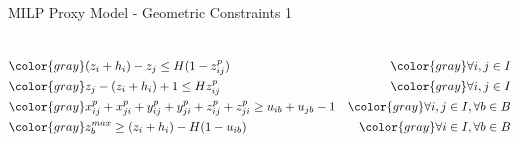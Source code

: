 \documentclass{beamer}
\begin{document}
\begin{frame}{MILP Proxy Model - Geometric Constraints 1}
\begin{columns}[onlytextwidth,T]
{\begin{minipage}{\linewidth}
\begin{align}
                                         & \color{gray} (z_i + h_i) - z_j\le H(1 - z^p_{ij})                                                     & \color{gray} \forall i,j \in I \notag \\
                                         & \color{gray} z_j - (z_i + h_i) + 1 \le H z^p_{ij}                                                     & \color{gray} \forall i,j \in I \notag \\
                                         & \color{gray} x^p_{ij} + x^p_{ji} + y^p_{ij} + y^p_{ji} + z^p_{ij} + z^p_{ji} \ge u_{ib} + u_{jb} - 1  & \color{gray} \forall i,j \in I, \forall b \in B \notag \\
                                         & \color{gray} z^{max}_b \ge (z_i + h_i) - H(1-u_{ib})                                                  & \color{gray} \forall i \in I, \forall b \in B \notag
                    \end{align}
                \end{minipage}
            }
            \end{columns}
    \end{frame}
\end{document}
